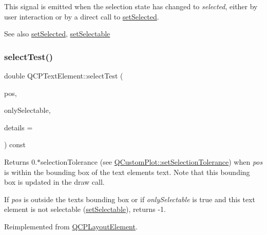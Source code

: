 This signal is emitted when the selection state has changed to {\itshape selected}, either by user interaction or by a direct call to \mbox{\hyperlink{class_q_c_p_text_element_aba5521f9fb22a5f3d2f09ab37d4a1751}{set\+Selected}}.

\begin{DoxySeeAlso}{See also}
\mbox{\hyperlink{class_q_c_p_text_element_aba5521f9fb22a5f3d2f09ab37d4a1751}{set\+Selected}}, \mbox{\hyperlink{class_q_c_p_text_element_a3c5f9b1897a036b16495ed3fb8371c55}{set\+Selectable}} 
\end{DoxySeeAlso}
\mbox{\label{class_q_c_p_text_element_a1e721bc2994a127ef5a8f0a514a5dbac}} 
\subsubsection{\texorpdfstring{select\+Test()}{selectTest()}}
{\footnotesize\ttfamily double Q\+C\+P\+Text\+Element\+::select\+Test (\begin{DoxyParamCaption}\item[{const Q\+PointF \&}]{pos,  }\item[{bool}]{only\+Selectable,  }\item[{Q\+Variant $\ast$}]{details = {} }\end{DoxyParamCaption}) const\hspace{0.3cm}{\ttfamily [virtual]}}

Returns 0.$\ast$selection\+Tolerance (see \mbox{\hyperlink{class_q_custom_plot_a4dc31241d7b09680950e19e5f971ed93}{Q\+Custom\+Plot\+::set\+Selection\+Tolerance}}) when {\itshape pos} is within the bounding box of the text element\textquotesingle{}s text. Note that this bounding box is updated in the draw call.

If {\itshape pos} is outside the text\textquotesingle{}s bounding box or if {\itshape only\+Selectable} is true and this text element is not selectable (\mbox{\hyperlink{class_q_c_p_text_element_a3c5f9b1897a036b16495ed3fb8371c55}{set\+Selectable}}), returns -\/1.

Reimplemented from \mbox{\hyperlink{class_q_c_p_layout_element_ae97f483cccedadbf18ea4525ef240ee4}{Q\+C\+P\+Layout\+Element}}.

\mbox{\label{class_q_c_p_text_element_a09b3241769528fa87cb4bf35c97defad}} 
